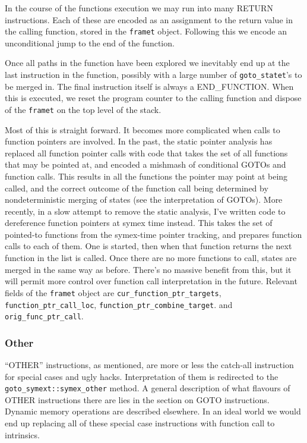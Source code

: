\documentclass{article}
\begin{document}
In the course of the functions execution we may run into many RETURN
instructions. Each of these are encoded as an assignment to the return value
in the calling function, stored in the \texttt{framet} object. Following this
we encode an unconditional jump to the end of the function.

Once all paths in the function have been explored we inevitably end up at the
last instruction in the function, possibly with a large number of
\texttt{goto\_statet}'s to be merged in. The final instruction itself is
always a END\_FUNCTION. When this is executed, we reset the program counter to
the calling function and dispose of the \texttt{framet} on the top level of the
stack.

Most of this is straight forward. It becomes more complicated when calls to
function pointers are involved. In the past, the static pointer analysis
has replaced all function pointer calls with code that takes the set of all
functions that may be pointed at, and encoded a mishmash of conditional GOTOs
and function calls. This results in all the functions the pointer may point at
being called, and the correct outcome of the function call being determined
by nondeterministic merging of states (see the interpretation of GOTOs). More
recently, in a slow attempt to remove the static analysis, I've written code
to dereference function pointers at symex time instead. This takes the set of
pointed-to functions from the symex-time pointer tracking, and prepares function
calls to each of them. One is started, then when that function returns the next
function in the list is called. Once there are no more functions to call,
states are merged in the same way as before. There's no massive benefit from
this, but it will permit more control over function call interpretation in
the future. Relevant fields of the \texttt{framet} object are
\texttt{cur\_function\_ptr\_targets}, \texttt{function\_ptr\_call\_loc},
\texttt{function\_ptr\_combine\_target}. and
\texttt{orig\_func\_ptr\_call}.

\subsubsection{Other}

``OTHER'' instructions, as mentioned, are more or less the catch-all instruction
for special cases and ugly hacks. Interpretation of them is redirected to the
\texttt{goto\_symext::symex\_other} method. A general description of what
flavours of OTHER instructions there are lies in the section on GOTO
instructions. Dynamic memory operations are described elsewhere. In an ideal
world we would end up replacing all of these special case instructions with
function call to intrinsics.
\end{document}
